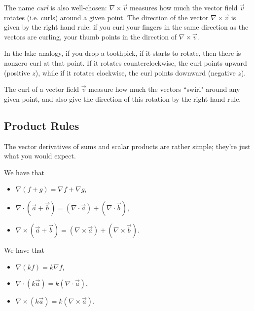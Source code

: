 The name \textit{curl} is also well-chosen: $\nabla \times \vec{v}$ measures how much the vector field $\vec{v}$ rotates (i.e. curls) around a given point. The direction of the vector $\nabla\times\vec{v}$ is given by the right hand rule: if you curl your fingers in the same direction as the vectors are curling, your thumb points in the direction of $\nabla\times\vec{v}$.

In the lake analogy, if you drop a toothpick, if it starts to rotate, then there is nonzero curl at that point. If it rotates counterclockwise, the curl points upward (positive $z$), while if it rotates clockwise, the curl points downward (negative $z$).

\begin{moral}
The curl of a vector field $\vec{v}$ measure how much the vectors ``swirl" around any given point, and also give the direction of this rotation by the right hand rule.
\end{moral}

\subsection{Product Rules}

The vector derivatives of sums and scalar products are rather simple; 
they're just what you would expect.

\begin{proposition}
    We have that
    \begin{itemize}
        \item $\nabla(f+g)=\nabla f+\nabla g$,
        \item $\nabla\cdot(\vec{a}+\vec{b})=(\nabla\cdot \vec{a}) + (\nabla \cdot \vec{b})$,
        \item $\nabla\times(\vec{a}+\vec{b})=(\nabla\times \vec{a}) + (\nabla \times \vec{b})$.
    \end{itemize}
\end{proposition}

\begin{proposition}
    We have that
    \begin{itemize}
        \item $\nabla(kf)=k\nabla f$,
        \item $\nabla\cdot(k\vec{a})=k(\nabla\cdot\vec{a})$,
        \item $\nabla\times(k\vec{a})=k(\nabla\times\vec{a})$.
    \end{itemize}
\end{proposition}

